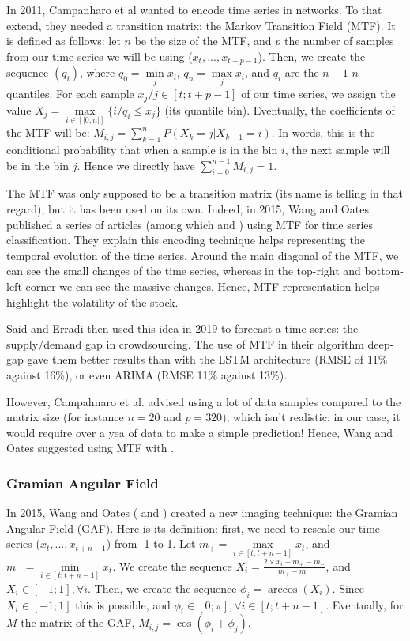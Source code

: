 \documentclass[11pt]{article}
\begin{document}
\begin{onehalfspace}
In 2011, Campanharo et al \cite{campanharo} wanted to encode time series in networks. To that extend, they needed a transition matrix: the Markov Transition Field (MTF). It is defined as follows: let $n$ be the size of the MTF, and $p$ the number of samples from our time series we will be using ($x_t,...,x_{t+p-1}$). Then, we create the sequence $(q_i)$, where $q_0 = \min\limits_j x_i$, $q_n = \max\limits_j x_i$, and $q_i$ are the $n-1$ $n$-quantiles. For each sample $x_j / j \in [t;t+p-1]$  of our time series, we assign the value $X_j = \max\limits_{i \in [|0;n|]} \{ i / q_i \leq x_j\}$ (its quantile bin). Eventually, the coefficients of the MTF will be: $M_{i,j} = \sum\limits_{k=1}^{n} P(X_k = j | X_{k-1} = i)$. In words, this is the conditional probability that when a sample is in the bin $i$, the next sample will be in the bin $j$. Hence we directly have $\sum\limits_{i=0}^{n-1} M_{i,j} = 1$. 

The MTF was only supposed to be a transition matrix (its name is telling in that regard), but it has been used on its own. Indeed, in 2015, Wang and Oates published a series of articles (among which \cite{wang} and \cite{wang_encod}) using MTF for time series classification. They explain this encoding technique helps representing the temporal evolution of the time series. Around the main diagonal of the MTF, we can see the small changes of the time series, whereas in the top-right and bottom-left corner we can see the massive changes. Hence, MTF representation helps highlight the volatility of the stock. 

Said and Erradi \cite{said} then used this idea in 2019 to forecast a time series: the supply/demand gap in crowdsourcing. The use of MTF in their algorithm deep-gap gave them better results than with the LSTM architecture (RMSE of 11\% against 16\%), or even ARIMA (RMSE 11\% against 13\%).

However, Campahnaro et al. \cite{campanharo} advised using a lot of data samples compared to the matrix size (for instance $n = 20$ and $p = 320$), which isn't realistic: in our case, it would require over a yea of data to make a simple prediction! Hence, Wang and Oates \cite{wang_encod} suggested using MTF with .

\subsubsection{Gramian Angular Field}
\label{gaf}

In 2015, Wang and Oates (\cite{wang_encod} and \cite{wang}) created a new imaging technique: the Gramian Angular Field (GAF). Here is its definition: first, we need to rescale our time series ($x_t, ..., x_{t+n-1}$) from -1 to 1. Let $m_+ = \max\limits_{i \in [t; t+n-1]} x_t$, and $m_- = \min\limits_{i \in [t; t+n-1]} x_t$. We create the sequence $X_i = \frac{2 \times x_i - m_+ - m_-}{m_+ - m_-}$, and $X_i \in [-1;1], \forall i$. Then, we create the sequence $\phi_i = \arccos(X_i)$. Since $X_i \in [-1;1]$ this is possible, and $\phi_i \in [0;\pi], \forall i \in [t;t+n-1]$. Eventually, for $M$ the matrix of the GAF, $M_{i,j} = \cos(\phi_i + \phi_j)$.


\end{onehalfspace}
\end{document}

